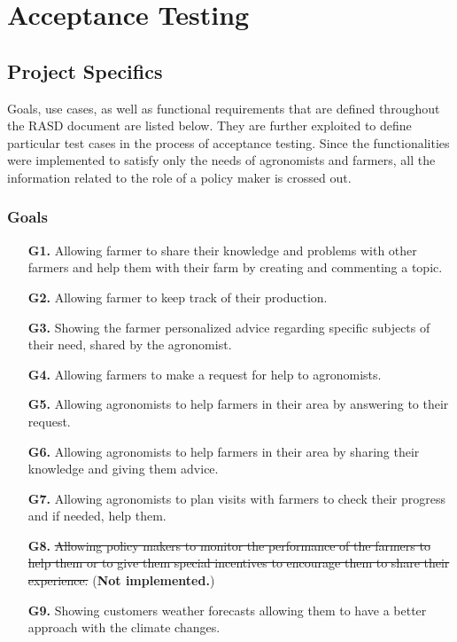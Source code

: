 \chapter{Acceptance Testing} \label{ch:acceptance_testing}


\section{Project Specifics}

Goals, use cases, as well as functional requirements that are defined throughout the RASD document are listed below. They are further exploited to define particular test cases in the process of acceptance testing. Since the functionalities were implemented to satisfy only the needs of agronomists and farmers, all the information related to the role of a policy maker is crossed out.

\subsection{Goals}

\begin{enumerate}
	\item [\textbf{G1.}] Allowing farmer to share their knowledge and problems with other farmers and help them with their farm by creating and commenting a topic.
	\item [\textbf{G2.}] Allowing farmer to keep track of their production.
	\item [\textbf{G3.}] Showing the farmer personalized advice regarding specific subjects of their need, shared by the agronomist.
	\item [\textbf{G4.}] Allowing farmers to make a request for help to agronomists.
	\item [\textbf{G5.}] Allowing agronomists to help farmers in their area by answering to their request.
	\item [\textbf{G6.}] Allowing agronomists to help farmers in their area by sharing their knowledge and giving them advice.
	\item [\textbf{G7.}] Allowing agronomists to plan visits with farmers to check their progress and if needed, help them.
	\item [\textbf{G8.}] \sout{Allowing policy makers to monitor the performance of the farmers to help them or to give them special incentives to encourage them to share their experience.} (\textbf{Not implemented.})
	\item [\textbf{G9.}] Showing customers weather forecasts allowing them to have a better approach with the climate changes.
\end{enumerate}

